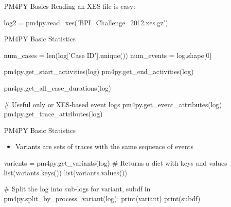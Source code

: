 \documentclass[ignorenonframetext,xcolor=x11names]{beamer}
\begin{document}
\begin{frame}[fragile]{PM4PY Basics}
Reading an XES file is easy:
\footnotesize
\begin{pythoncode}
log2 = pm4py.read_xes('BPI_Challenge_2012.xes.gz')
\end{pythoncode}
\end{frame}

\begin{frame}[fragile]{PM4PY Basic Statistics}
\footnotesize
\begin{pythoncode}
num_cases = len(log['Case ID'].unique())
num_events = log.shape[0]

pm4py.get_start_activities(log)
pm4py.get_end_activities(log)

pm4py.get_all_case_durations(log)

# Useful only or XES-based event logs
pm4py.get_event_attributes(log)
pm4py.get_trace_attributes(log)
\end{pythoncode}
\end{frame}





\begin{frame}[fragile]{PM4PY Basic Statistics}
\begin{itemize}
   \item Variants are sets of traces with the same sequence of events
\end{itemize}
\footnotesize
\begin{pythoncode}
varients = pm4py.get_variants(log)
# Returns a dict with keys and values
list(variants.keys())
list(variants.values())

# Split the log into sub-logs
for variant, subdf in pm4py.split_by_process_variant(log):
    print(variant)
    print(subdf)  
\end{pythoncode}
\end{frame}
\end{document}
